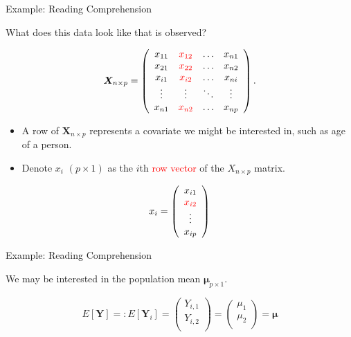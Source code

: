 \documentclass[
  ignorenonframetext,
]{beamer}
\newcommand{\bmu}{\bm{\mu}}
\begin{document}
\begin{frame}{Example: Reading Comprehension}
\protect\hypertarget{example-reading-comprehension-1}{}

What does this data look like that is observed?

\[\bm{X}_{n \times p} = 
\left( \begin{array}{cccc}
x_{11} & \textcolor{red}{x_{12}} & \ldots&  x_{n1}\\
x_{21} & \textcolor{red}{x_{22}} & \ldots& x_{n2} \\
x_{i1} & \textcolor{red}{x_{i2}} & \ldots& x_{ni} \\
\vdots & \vdots & \ddots & \vdots \\
x_{n1} & \textcolor{red}{x_{n2}} &\ldots& x_{np}
\end{array} \right).
\]

\begin{itemize}
\item
  A row of \(\bm{X}_{n \times p}\) represents a covariate we might be
  interested in, such as age of a person.
\item
  Denote \(x_{i}\) \((p \times 1)\) as the \(i\)th
  \textcolor{red}{row vector} of the \(X_{n \times p}\) matrix.
\end{itemize}

\[  x_{i}= \left( \begin{array}{c}
x_{i1}\\
\textcolor{red}{x_{i2}}\\
\vdots\\
x_{ip}
\end{array} \right) \]

\end{frame}

\begin{frame}{Example: Reading Comprehension}
\protect\hypertarget{example-reading-comprehension-2}{}

We may be interested in the population mean \(\bmu_{p \times 1}.\)

\[
E[\bm{Y}] =: E[\bm{Y}_{i}] = \left( \begin{array}{c}
Y_{i,1}\\
Y_{i,2}\\
\end{array} \right) 
=  \left( \begin{array}{c}
\mu_1\\
\mu_2\\
\end{array} \right) 
= 
\bmu
\]

\end{frame}
\end{document}

